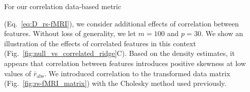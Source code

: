 \documentclass[aoas]{imsart}
\begin{document}
For our correlation data-based metric

\noindent (Eq.~\ref{eq:D_rs-fMRI}), we consider additional effects of correlation between features. Without loss of generality, we let $m=100$ and $p=30$. We show an illustration of the effects of correlated features in this context (Fig.~\ref{fig:null_vs_correlated_ridge}C). Based on the density estimates, it appears that correlation between features introduces positive skewness at low values of $\bar{r}_\text{abs}$. We introduced correlation to the transformed data matrix (Fig.~\ref{fig:rs-fMRI_matrix}) with the Cholesky method used previously.
%

\end{document}

